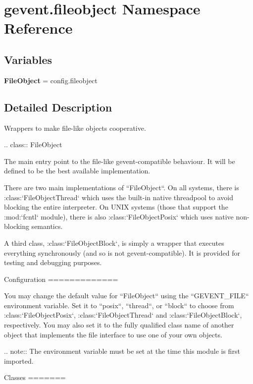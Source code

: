 \hypertarget{namespacegevent_1_1fileobject}{}\section{gevent.\+fileobject Namespace Reference}
\label{namespacegevent_1_1fileobject}
\subsection*{Variables}
\begin{DoxyCompactItemize}
\item 
\mbox{\label{namespacegevent_1_1fileobject_a8b5971757e4fa1e2581d98114b7b66fe}} 
{\bfseries File\+Object} = config.\+fileobject
\end{DoxyCompactItemize}


\subsection{Detailed Description}
\begin{DoxyVerb}Wrappers to make file-like objects cooperative.

.. class:: FileObject

   The main entry point to the file-like gevent-compatible behaviour. It will be defined
   to be the best available implementation.

There are two main implementations of ``FileObject``. On all systems,
there is :class:`FileObjectThread` which uses the built-in native
threadpool to avoid blocking the entire interpreter. On UNIX systems
(those that support the :mod:`fcntl` module), there is also
:class:`FileObjectPosix` which uses native non-blocking semantics.

A third class, :class:`FileObjectBlock`, is simply a wrapper that executes everything
synchronously (and so is not gevent-compatible). It is provided for testing and debugging
purposes.

Configuration
=============

You may change the default value for ``FileObject`` using the
``GEVENT_FILE`` environment variable. Set it to ``posix``, ``thread``,
or ``block`` to choose from :class:`FileObjectPosix`,
:class:`FileObjectThread` and :class:`FileObjectBlock`, respectively.
You may also set it to the fully qualified class name of another
object that implements the file interface to use one of your own
objects.

.. note:: The environment variable must be set at the time this module
   is first imported.

Classes
=======
\end{DoxyVerb}
 